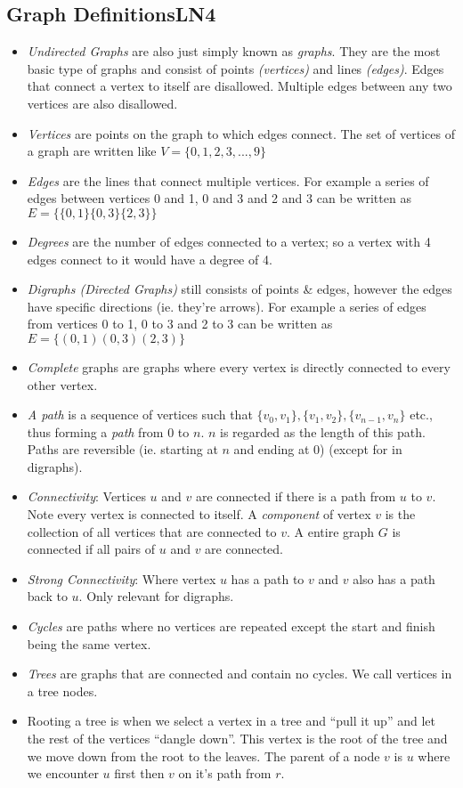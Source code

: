 \documentclass[a4paper]{article}
\begin{document}
\begin{tcolorbox}[breakable]
	\section*{Graph Definitions\hfill{LN4}}
	\begin{itemize}
		\item \emph{Undirected Graphs} are also just simply known as \emph{graphs}. They are the most basic type of graphs and consist of points \emph{(vertices)} and lines \emph{(edges)}. Edges that connect a vertex to itself are disallowed. Multiple edges between any two vertices are also disallowed.
		\item \emph{Vertices} are points on the graph to which edges connect. The set of vertices of a graph are written like $V = \{0, 1, 2, 3, ..., 9\}$
		\item \emph{Edges} are the lines that connect multiple vertices. For example a series of edges between vertices 0 and 1, 0 and 3 and 2 and 3 can be written as $E = \{\{0,1\}\{0,3\}\{2,3\}\}$
		\item \emph{Degrees} are the number of edges connected to a vertex; so a vertex with 4 edges connect to it would have a degree of 4.
		\item \emph{Digraphs (Directed Graphs)} still consists of points \& edges, however the edges have specific directions (ie. they're arrows). For example a series of edges from vertices 0 to 1, 0 to 3 and 2 to 3 can be written as $E = \{(0,1)(0,3)(2,3)\}$
		\item \emph{Complete} graphs are graphs where every vertex is directly connected to every other vertex.
		\item \emph{A path} is a sequence of vertices such that $\{v_0, v_1\}, \{v_1, v_2\}, \{v_{n-1}, v_n\}$ etc., thus forming a \emph{path} from $0$ to $n$. $n$ is regarded as the length of this path. Paths are reversible (ie. starting at $n$ and ending at $0$) (except for in digraphs).
		\item \emph{Connectivity}: Vertices $u$ and $v$ are connected if there is a path from $u$ to $v$. Note every vertex is connected to itself. A \emph{component} of vertex $v$ is the collection of all vertices that are connected to $v$. A entire graph $G$ is connected if all pairs of $u$ and $v$ are connected.
		\item \emph{Strong Connectivity}: Where vertex $u$ has a path to $v$ and $v$ also has a path back to $u$. Only relevant for digraphs.
		\item \emph{Cycles} are paths where no vertices are repeated except the start and finish being the same vertex.
		\item \emph{Trees} are graphs that are connected and contain no cycles. We call vertices in a tree nodes.
		\item Rooting a tree is when we select a vertex in a tree and ``pull it up'' and let the rest of the vertices ``dangle down''. This vertex is the root of the tree and we move down from the root to the leaves. The parent of a node $v$ is $u$ where we encounter $u$ first then $v$ on it's path from $r$.
	\end{itemize}
\end{tcolorbox}
\end{document}

